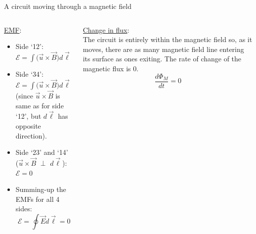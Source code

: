 \begin{frame}{A circuit moving through a magnetic field}
\begin{columns}[t]
  \begin{column}{0.50\textwidth}
  {\scriptsize
    \underline{EMF}:\\
    \vspace{0.2cm}
    \begin{itemize}
       \item Side `12':
             $\mathcal{E} = \int \Big( \vec{u} \times \vec{B} \Big) d\vec{\ell} = uBb$
       \item Side `34':
             $\mathcal{E} = \int \Big( \vec{u} \times \vec{B} \Big) d\vec{\ell} = -uBb$\\
             (since $\vec{u} \times \vec{B}$ is same as for side `12',
             but $d\vec{\ell}$ has opposite direction).
       \item Side `23' and `14' ($\vec{u} \times \vec{B}$ $\perp$ $d\vec{\ell}$):
             $\mathcal{E} = 0$
       \item Summing-up the EMFs for all 4 sides:
            {\color{magenta}
              \begin{equation*}
               \mathcal{E} = \oint \vec{E} d\vec{\ell} = 0
              \end{equation*}
            }
    \end{itemize}
  }
  \end{column}
  \begin{column}{0.50\textwidth}
  {\scriptsize
    \underline{Change in flux}:\\
    \vspace{0.1cm}
    The circuit is entirely within the magnetic field so, as it moves,
    there are as many magnetic field line entering its surface as ones exiting.
    The rate of change of the magnetic flux is 0.
    {\color{magenta}
      \begin{equation*}
        \frac{d\Phi_{M}}{dt} = 0
      \end{equation*}
    }
  }
  \end{column}
\end{columns}

\end{frame}

%
%
%

